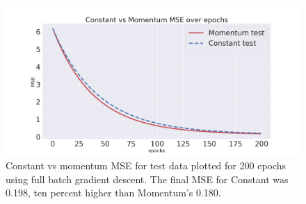 \documentclass[onecolumn,10pt,cleanfoot]{asme2ej}
\begin{document}

\begin{figure}[h]
\centerline{\includegraphics[width=5in]{figure/constant_v_momentum.png}}
\caption{Constant vs momentum MSE for test data plotted for 200 epochs using full batch gradient descent. The final MSE for Constant was 0.198, ten percent higher than Momentum's 0.180.}
\label{constant_v_momentum}
\end{figure}
\end{document}
